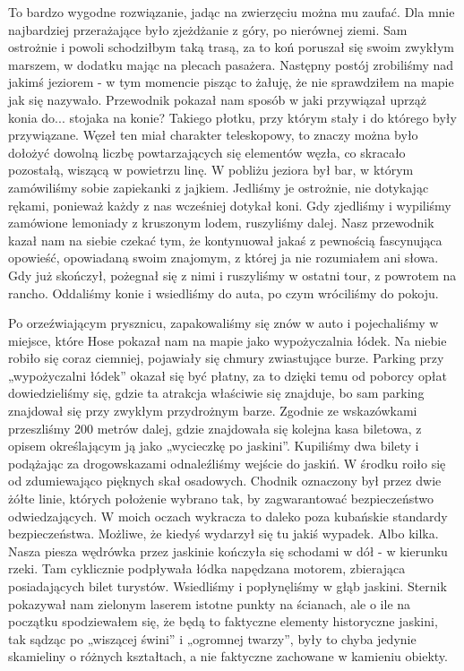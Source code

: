 To bardzo wygodne rozwiązanie, jadąc na zwierzęciu można mu zaufać.
Dla mnie najbardziej przerażające było zjeżdżanie z góry, po nierównej ziemi.
Sam ostrożnie i powoli schodziłbym taką trasą, za to koń poruszał się swoim zwykłym marszem, w dodatku mając na plecach pasażera.
Następny postój zrobiliśmy nad jakimś jeziorem - w tym momencie pisząc to żałuję, że nie sprawdziłem na mapie jak się nazywało.
Przewodnik pokazał nam sposób w jaki przywiązał uprząż konia do...
stojaka na konie?
Takiego płotku, przy którym stały i do którego były przywiązane.
Węzeł ten miał charakter teleskopowy, to znaczy można było dołożyć dowolną liczbę powtarzających się elementów węzła, co skracało pozostałą, wiszącą w powietrzu linę.
W pobliżu jeziora był bar, w którym zamówiliśmy sobie zapiekanki z jajkiem.
Jedliśmy je ostrożnie, nie dotykając rękami, ponieważ każdy z nas wcześniej dotykał koni.
Gdy zjedliśmy i wypiliśmy zamówione lemoniady z kruszonym lodem, ruszyliśmy dalej.
Nasz przewodnik kazał nam na siebie czekać tym, że kontynuował jakaś z pewnością fascynująca opowieść, opowiadaną swoim znajomym, z której ja nie rozumiałem ani słowa.
Gdy już skończył, pożegnał się z nimi i ruszyliśmy w ostatni tour, z powrotem na rancho.
Oddaliśmy konie i wsiedliśmy do auta, po czym wróciliśmy do pokoju.
\par Po orzeźwiającym prysznicu, zapakowaliśmy się znów w auto i pojechaliśmy w miejsce, które Hose pokazał nam na mapie jako wypożyczalnia łódek.
Na niebie robiło się coraz ciemniej, pojawiały się chmury zwiastujące burze.
Parking przy „wypożyczalni łódek” okazał się być płatny, za to dzięki temu od poborcy opłat dowiedzieliśmy się, gdzie ta atrakcja właściwie się znajduje, bo sam parking znajdował się przy zwykłym przydrożnym barze.
Zgodnie ze wskazówkami przeszliśmy 200 metrów dalej, gdzie znajdowała się kolejna kasa biletowa, z opisem określającym ją jako „wycieczkę po jaskini”.
Kupiliśmy dwa bilety i podążając za drogowskazami odnaleźliśmy wejście do jaskiń.
W środku roiło się od zdumiewająco pięknych skał osadowych.
Chodnik oznaczony był przez dwie żółte linie, których położenie wybrano tak, by zagwarantować bezpieczeństwo odwiedzających.
W moich oczach wykracza to daleko poza kubańskie standardy bezpieczeństwa.
Możliwe, że kiedyś wydarzył się tu jakiś wypadek.
Albo kilka.
Nasza piesza wędrówka przez jaskinie kończyła się schodami w dół - w kierunku rzeki.
Tam cyklicznie podpływała łódka napędzana motorem, zbierająca posiadających bilet turystów.
Wsiedliśmy i popłynęliśmy w głąb jaskini.
Sternik pokazywał nam zielonym laserem istotne punkty na ścianach, ale o ile na początku spodziewałem się, że będą to faktyczne elementy historyczne jaskini, tak sądząc po „wiszącej świni” i „ogromnej twarzy”, były to chyba jedynie skamieliny o różnych kształtach, a nie faktyczne zachowane w kamieniu obiekty.
